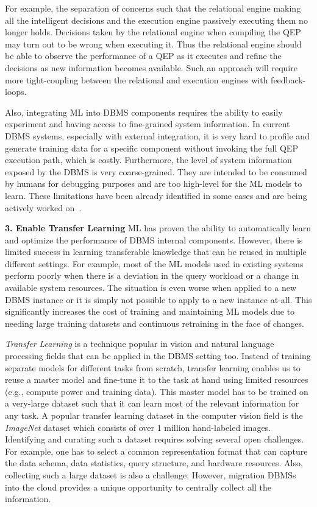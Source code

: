 For example, the separation of concerns such that the relational engine making all the intelligent decisions and the execution engine passively executing them no longer holds.
Decisions taken by the relational engine when compiling the QEP may turn out to be wrong when executing it.
Thus the relational engine should be able to observe the performance of a QEP as it executes and refine the decisions as new information becomes available.
Such an approach will require more tight-coupling between the relational and execution engines with feedback-loops.

Also, integrating ML into DBMS components requires the ability to easily experiment and having access to fine-grained system information.
In current DBMS systems, especially with external integration, it is very hard to profile and generate training data for a specific component without invoking the full QEP execution path, which is costly.
Furthermore, the level of system information exposed by the DBMS is very coarse-grained.
They are intended to be consumed by humans for debugging purposes and are too high-level for the ML models to learn.
These limitations have been already identified in some cases and are being actively worked on~\cite{noisepage}.

\vspace{2mm}
\noindent \textbf{3. Enable Transfer Learning} ML has proven the ability to automatically learn and optimize the performance of DBMS internal components.
However, there is limited success in learning transferable knowledge that can be reused in multiple different settings.
For example, most of the ML models used in existing systems perform poorly when there is a deviation in the query workload or a change in available system resources.
The situation is even worse when applied to a new DBMS instance or it is simply not possible to apply to a new instance at-all.
This significantly increases the cost of training and maintaining ML models due to needing large training datasets and continuous retraining in the face of changes.

\textit{Transfer Learning} is a technique popular in vision and natural language processing fields that can be applied in the DBMS setting too.
Instead of training separate models for different tasks from scratch, transfer learning enables us to reuse a master model and fine-tune it to the task at hand using limited resources (e.g., compute power and training data).
This master model has to be trained on a very-large dataset such that it can learn most of the relevant information for any task.
A popular transfer learning dataset in the computer vision field is the \textit{ImageNet} dataset which consists of over 1 million hand-labeled images.
Identifying and curating such a dataset requires solving several open challenges.
For example, one has to select a common representation format that can capture the data schema, data statistics, query structure, and hardware resources.
Also, collecting such a large dataset is also a challenge.
However, migration DBMSs into the cloud provides a unique opportunity to centrally collect all the information.
